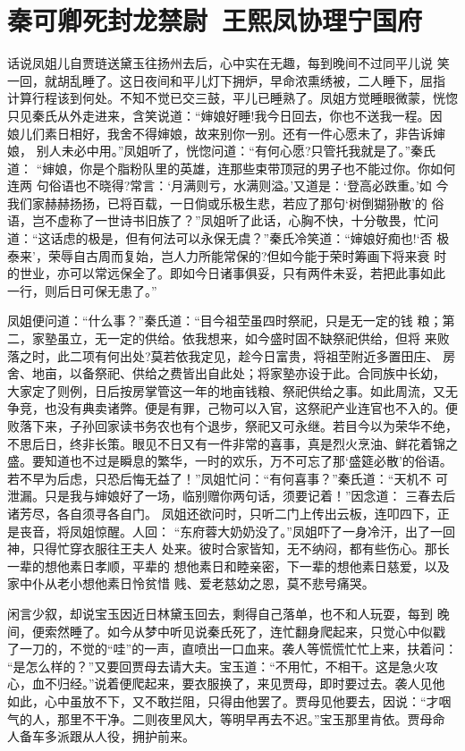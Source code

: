 \chapter{秦可卿死封龙禁尉~王熙凤协理宁国府}

话说凤姐儿自贾琏送黛玉往扬州去后，心中实在无趣，每到晚间不过同平儿说
笑一回，就胡乱睡了。这日夜间和平儿灯下拥炉，早命浓熏绣被，二人睡下，屈指
计算行程该到何处。不知不觉已交三鼓，平儿已睡熟了。凤姐方觉睡眼微蒙，恍惚
只见秦氏从外走进来，含笑说道：“婶娘好睡!我今日回去，你也不送我一程。因
娘儿们素日相好，我舍不得婶娘，故来别你一别。还有一件心愿未了，非告诉婶娘，
别人未必中用。”凤姐听了，恍惚问道：“有何心愿?只管托我就是了。”秦氏道：
“婶娘，你是个脂粉队里的英雄，连那些束带顶冠的男子也不能过你。你如何连两
句俗语也不晓得?常言：‘月满则亏，水满则溢。’又道是：‘登高必跌重。’如
今我们家赫赫扬扬，已将百载，一日倘或乐极生悲，若应了那句‘树倒猢狲散’的
俗语，岂不虚称了一世诗书旧族了？”凤姐听了此话，心胸不快，十分敬畏，忙问
道：“这话虑的极是，但有何法可以永保无虞？”秦氏冷笑道：“婶娘好痴也!‘否
极泰来’，荣辱自古周而复始，岂人力所能常保的?但如今能于荣时筹画下将来衰
时的世业，亦可以常远保全了。即如今日诸事俱妥，只有两件未妥，若把此事如此
一行，则后日可保无患了。”

凤姐便问道：“什么事？”秦氏道：“目今祖茔虽四时祭祀，只是无一定的钱
粮；第二，家塾虽立，无一定的供给。依我想来，如今盛时固不缺祭祀供给，但将
来败落之时，此二项有何出处?莫若依我定见，趁今日富贵，将祖茔附近多置田庄、
房舍、地亩，以备祭祀、供给之费皆出自此处；将家塾亦设于此。合同族中长幼，
大家定了则例，日后按房掌管这一年的地亩钱粮、祭祀供给之事。如此周流，又无
争竞，也没有典卖诸弊。便是有罪，己物可以入官，这祭祀产业连官也不入的。便
败落下来，子孙回家读书务农也有个退步，祭祀又可永继。若目今以为荣华不绝，
不思后日，终非长策。眼见不日又有一件非常的喜事，真是烈火烹油、鲜花着锦之
盛。要知道也不过是瞬息的繁华，一时的欢乐，万不可忘了那‘盛筵必散’的俗语。
若不早为后虑，只恐后悔无益了！”凤姐忙问：“有何喜事？”秦氏道：“天机不
可泄漏。只是我与婶娘好了一场，临别赠你两句话，须要记着！”因念道：
三春去后诸芳尽，各自须寻各自门。
凤姐还欲问时，只听二门上传出云板，连叩四下，正是丧音，将凤姐惊醒。人回：
“东府蓉大奶奶没了。”凤姐吓了一身冷汗，出了一回神，只得忙穿衣服往王夫人
处来。彼时合家皆知，无不纳闷，都有些伤心。那长一辈的想他素日孝顺，平辈的
想他素日和睦亲密，下一辈的想他素日慈爱，以及家中仆从老小想他素日怜贫惜
贱、爱老慈幼之恩，莫不悲号痛哭。

闲言少叙，却说宝玉因近日林黛玉回去，剩得自己落单，也不和人玩耍，每到
晚间，便索然睡了。如今从梦中听见说秦氏死了，连忙翻身爬起来，只觉心中似戳
了一刀的，不觉的“哇”的一声，直喷出一口血来。袭人等慌慌忙忙上来，扶着问：
“是怎么样的？”又要回贾母去请大夫。宝玉道：“不用忙，不相干。这是急火攻
心，血不归经。”说着便爬起来，要衣服换了，来见贾母，即时要过去。袭人见他
如此，心中虽放不下，又不敢拦阻，只得由他罢了。贾母见他要去，因说：“才咽
气的人，那里不干净。二则夜里风大，等明早再去不迟。”宝玉那里肯依。贾母命
人备车多派跟从人役，拥护前来。

